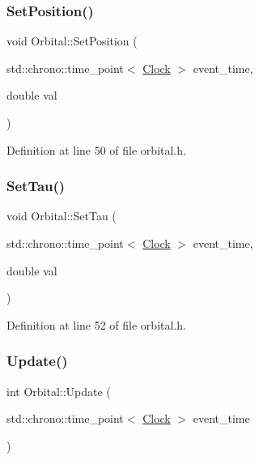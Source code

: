 \subsubsection{\texorpdfstring{Set\+Position()}{SetPosition()}}
{\footnotesize\ttfamily void Orbital\+::\+Set\+Position (\begin{DoxyParamCaption}\item[{std\+::chrono\+::time\+\_\+point$<$ \hyperlink{universe_8h_a0ef8d951d1ca5ab3cfaf7ab4c7a6fd80}{Clock} $>$}]{event\+\_\+time,  }\item[{double}]{val }\end{DoxyParamCaption})\hspace{0.3cm}{\ttfamily [inline]}}



Definition at line 50 of file orbital.\+h.

\mbox{\label{class_orbital_afd09baa67f1a9bff08c74dcf60e1398a}} 
\subsubsection{\texorpdfstring{Set\+Tau()}{SetTau()}}
{\footnotesize\ttfamily void Orbital\+::\+Set\+Tau (\begin{DoxyParamCaption}\item[{std\+::chrono\+::time\+\_\+point$<$ \hyperlink{universe_8h_a0ef8d951d1ca5ab3cfaf7ab4c7a6fd80}{Clock} $>$}]{event\+\_\+time,  }\item[{double}]{val }\end{DoxyParamCaption})\hspace{0.3cm}{\ttfamily [inline]}}



Definition at line 52 of file orbital.\+h.

\mbox{\label{class_orbital_a837289c3b2af844724c381707dee40d0}} 
\subsubsection{\texorpdfstring{Update()}{Update()}}
{\footnotesize\ttfamily int Orbital\+::\+Update (\begin{DoxyParamCaption}\item[{std\+::chrono\+::time\+\_\+point$<$ \hyperlink{universe_8h_a0ef8d951d1ca5ab3cfaf7ab4c7a6fd80}{Clock} $>$}]{event\+\_\+time }\end{DoxyParamCaption})\hspace{0.3cm}{\ttfamily [virtual]}}



